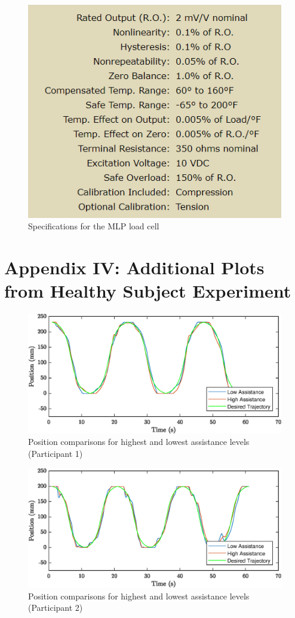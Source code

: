 \documentclass[12pt]{report}
\begin{document}
	\begin{figure}[h] 
		\centering
		\includegraphics[width=0.75\linewidth]{load_cell_spec}
		\caption{Specifications for the MLP load cell}
		\label{fig:load_cell}
	\end{figure}


\afterpage{\null\newpage}
\chapter*{Appendix IV: Additional Plots from Healthy Subject Experiment} \label{ap:plots}

\begin{figure}[h] 
	\centering
	\includegraphics[width=\linewidth]{pos1}
	\caption{Position comparisons for highest and lowest assistance levels (Participant 1)}
	\label{fig:pos1}
\end{figure}

\begin{figure}[h] 
	\centering
	\includegraphics[width=\linewidth]{pos2}
	\caption{Position comparisons for highest and lowest assistance levels (Participant 2)}
	\label{fig:pos2}
\end{figure}
\end{document}
